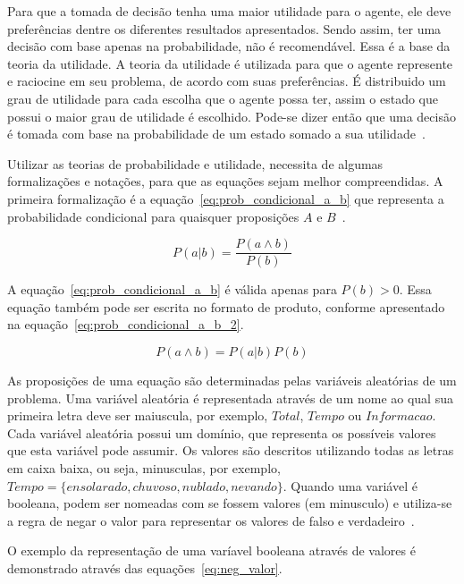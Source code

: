 Para que a tomada de decisão tenha uma maior utilidade para o agente, ele deve preferências dentre os diferentes resultados apresentados. Sendo assim, ter uma decisão com base apenas na probabilidade, não é recomendável. Essa é a base da teoria da utilidade. A teoria da utilidade é utilizada para que o agente represente e raciocine em seu problema, de acordo com suas preferências. É distribuido um grau de utilidade para cada escolha que o agente possa ter, assim o estado que possui o maior grau de utilidade é escolhido. Pode-se dizer então que uma decisão é tomada com base na probabilidade de um estado somado a sua utilidade~\cite{Russell:2002}.

Utilizar as teorias de probabilidade e utilidade, necessita de algumas formalizações e notações, para que as equações sejam melhor compreendidas. A primeira formalização é a equação~\ref{eq:prob_condicional_a_b} que representa a probabilidade condicional para quaisquer proposições $A$ e $B$~\cite{Russell:2002}.

\begin{equation}
    \label{eq:prob_condicional_a_b}
    P(a|b) = \frac{P(a \land b)}{P(b)}
\end{equation}

A equação~\ref{eq:prob_condicional_a_b} é válida apenas para $P(b) > 0$. Essa equação também pode ser escrita no formato de produto, conforme apresentado na equação~\ref{eq:prob_condicional_a_b_2}.

\begin{equation}
    \label{eq:prob_condicional_a_b_2}
    P(a \land b) = P(a|b)P(b)
\end{equation}

As proposições de uma equação são determinadas pelas variáveis aleatórias de um problema. Uma variável aleatória é representada através de um nome ao qual sua primeira letra deve ser maiuscula, por exemplo, $Total$, $Tempo$ ou $Informacao$. Cada variável aleatória possui um domínio, que representa os possíveis valores que esta variável pode assumir. Os valores são descritos utilizando todas as letras em caixa baixa, ou seja, minusculas, por exemplo, $Tempo = \{ ensolarado, chuvoso, nublado, nevando \}$. Quando uma variável é booleana, podem ser nomeadas com se fossem valores (em minusculo) e utiliza-se a regra de negar o valor para representar os valores de falso e verdadeiro~\cite{Russell:2002}.

O exemplo da representação de uma varíavel booleana através de valores é demonstrado através das equações~\ref{eq:neg_valor}.

